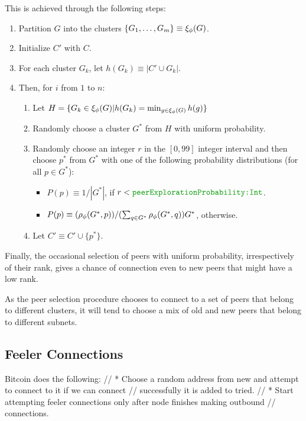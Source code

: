 \documentclass[]{llncs}
\newcommand{\conf}[2]{{\color{dkgreen}\texttt{#1:#2}}}
\begin{document}
This is achieved through the following steps:
\begin{enumerate}
\item Partition $G$ into the clusters $\{ G_1, \ldots, G_m \} \equiv \xi_{\phi}(G)$. 
\item Initialize $C'$ with $C$. 
\item For each cluster $G_k$, let $h(G_k) \equiv |C' \cup G_k|$.
\item Then, for $i$ from $1$ to $n$:
   \begin{enumerate}
   \item Let $H = \{ G_k \in \xi_{\phi}(G) | h(G_k) = \min_{g \in \xi_{\phi}(G)} h(g) \}$
   \item Randomly choose a cluster $G^*$ from $H$ with uniform probability.
   \item Randomly choose an integer $r$ in the $[0, 99]$ integer interval and then choose $p^*$ from $G^*$ with one of the following probability distributions (for all $p \in G^*$):
      \begin{itemize}
      	 \item $P(p) \equiv 1/|G^*|$, if $r < \conf{peerExplorationProbability}{Int}$.
         \item $P(p) \equiv (\rho_{\phi}(G^*, p))/(\sum_{q \in G^*} \rho_{\phi}(G^*, q)) G^*$, otherwise.
      \end{itemize}
   \item Let $C' \equiv C' \cup \{ p^* \}$.      
   \end{enumerate}
\end{enumerate}



Finally, the occasional selection of peers with uniform probability, irrespectively of their rank,
gives a chance of connection even to new peers that might have a low rank.


As the peer selection procedure chooses to connect to a set of peers that belong to different clusters,
it will tend to choose a mix of old and new peers that belong to different subnets.



\subsection{Feeler Connections}

Bitcoin does the following:
        //  * Choose a random address from new and attempt to connect to it if we can connect
        //    successfully it is added to tried.
        //  * Start attempting feeler connections only after node finishes making outbound
        //    connections.
\end{document}
